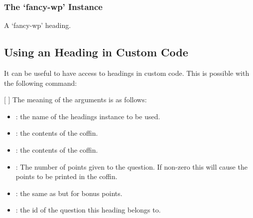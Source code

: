 \documentclass[load-preamble+]{cnltx-doc}
\begin{document}
\subsubsection{The `fancy-wp' Instance}
\begin{sourcecode}
\end{sourcecode}
\begin{question}[subtitle=The subtitle of the question]{1}
  A `fancy-wp' heading. \sample
\end{question}

\subsection{Using an \ExSheets{} Heading in Custom Code}\label{sec:using-an-exsheets}

It can be useful to have access to \ExSheets{} headings in custom code.  This
is possible with the following command:

\begin{commands}
  [%
    ]
    The meaning of the arguments is as follows:
    \begin{itemize}
      \item {}: the name of the headings instance to be used.
      \item {}: the contents of the  coffin.
      \item {}: the contents of the  coffin.
      \item {}: The number of points given to the question.  If
        non-zero this will cause the points to be printed in the 
        coffin.
      \item {}: the same as  but for bonus points.
      \item {}: the \acs{id} of the question this heading belongs to.
    \end{itemize}
\end{commands}
\end{document}
